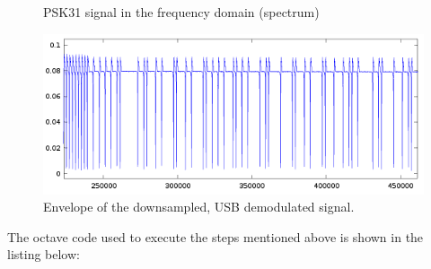 \begin{figure}

\caption{PSK31 signal in the frequency domain (spectrum)}
\label{fig:psk31_signal_spectrum}
\end{figure}

\begin{figure}
	\centering
	\includegraphics[width=1\linewidth]{gfx/psk31/psk31_envelope.png}
	\caption{Envelope of the downsampled, USB demodulated signal.}
	\label{fig:psk31_envelope}
\end{figure}

The octave code used to execute the steps mentioned above is shown in the
listing below:

